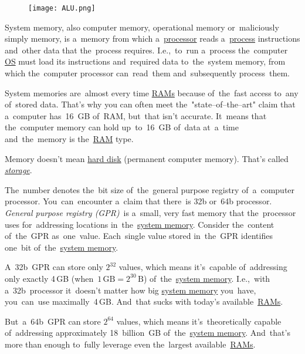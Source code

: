 \begin{figure}
    \centering
    \texttt{[image: ALU.png]}
\end{figure}
\newpage

\label{systemmemory}
System memory, also computer memory, operational memory or~maliciously simply memory, is a~memory from which a~\hyperref[processorcpucore]{processor} reads a~\hyperref[applicationprocessprogramservicethread]{process} instructions and~other data that the~process requires.
I.e.,~to~run a~process the~computer \hyperref[os]{OS} must load its instructions and~required data to~the~system memory, from which the~computer processor can~read~them and~subsequently process~them.

System memories are~almost every time \hyperref[ram]{RAMs} because of~the~fast access to~any of~stored data.
That's why you can often meet the~"state--of--the--art" claim that a~computer has~16~GB of~RAM, but~that isn't accurate.
It~means that the~computer memory can hold up~to~16~GB of~data at~a~time and~the~memory is the~\hyperref[ram]{RAM} type.

\warning Memory doesn't mean \hyperref[harddiskdrive]{hard disk} (permanent computer memory).
That's called \hyperref[harddiskdrive]{\textit{storage}}.

\label{32bvs64b}
The~number denotes the~bit size of~the~general purpose registry of~a~computer processor.
You~can~encounter a~claim that there~is 32b or~64b processor. \textit{General purpose registry (GPR)}~is a~small, very fast memory that the~processor uses for~addressing locations in~the~\hyperref[systemmemory]{system memory}.
Consider the~content of~the~GPR as~one~value.
Each~single value stored in~the~GPR identifies one~bit of~the~\hyperref[systemmemory]{system memory}.

A~32b~GPR can store only $2^{32}$ values, which means it's~capable of~addressing only exactly 4\,GB (when~$1\,\textrm{GB}=2^{30}\,\textrm{B}$) of~the~\hyperref[systemmemory]{system memory}.
I.e.,~with a~32b~processor it~doesn't matter how big \hyperref[systemmemory]{system memory} you~have, you~can~use maximally~4\,GB.
And~that sucks with today's available~\hyperref[ram]{RAMs}.

But~a~64b~GPR can store $2^{64}$ values, which means it's~theoretically capable of~addressing approximately 18~billion~GB of~the~\hyperref[systemmemory]{system memory}.
And~that's more than enough to~fully leverage even the~largest available~\hyperref[ram]{RAMs}.

